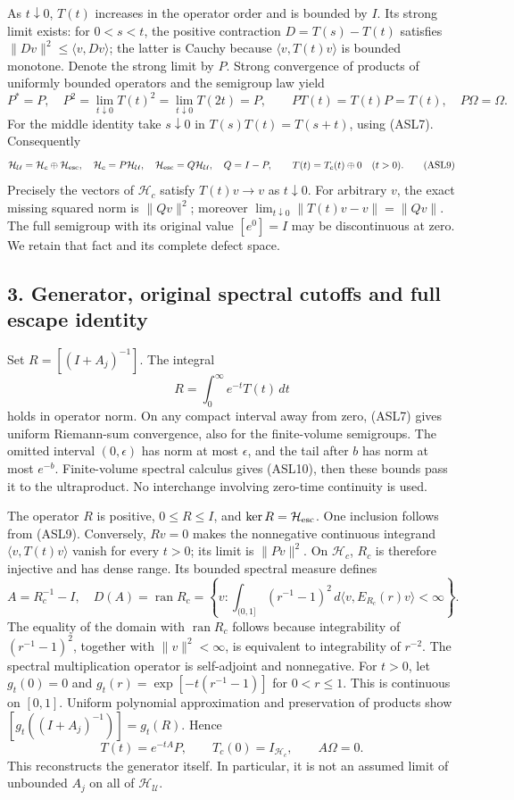 \documentclass[11pt]{article}
\begin{document}
As \(t\downarrow0\), \(T(t)\) increases in the operator order and is bounded by \(I\). Its strong limit exists: for \(0<s<t\), the positive contraction \(D=T(s)-T(t)\) satisfies \(\|Dv\|^2\le\langle v,Dv\rangle\); the latter is Cauchy because \(\langle v,T(t)v\rangle\) is bounded monotone. Denote the strong limit by \(P\). Strong convergence of products of uniformly bounded operators and the semigroup law yield
\[
 P^*=P,\quad P^2=\lim_{t\downarrow0}T(t)^2
 =\lim_{t\downarrow0}T(2t)=P,\qquad
 PT(t)=T(t)P=T(t),\quad P\Omega=\Omega.
 \tag{ASL8}
\]
For the middle identity take \(s\downarrow0\) in \(T(s)T(t)=T(s+t)\), using (ASL7). Consequently
\[
 \mathcal H_{\mathcal U}=\mathcal H_c\oplus\mathcal H_{\rm esc},\quad
 \mathcal H_c=P\mathcal H_{\mathcal U},\quad
 \mathcal H_{\rm esc}=Q\mathcal H_{\mathcal U},\quad Q=I-P,
 \qquad T(t)=T_c(t)\oplus0\quad(t>0).
 \tag{ASL9}
\]
Precisely the vectors of \(\mathcal H_c\) satisfy \(T(t)v\to v\) as \(t\downarrow0\). For arbitrary \(v\), the exact missing squared norm is \(\|Qv\|^2\); moreover \(\lim_{t\downarrow0}\|T(t)v-v\|=\|Qv\|\). The full semigroup with its original value \([e^0]=I\) may be discontinuous at zero. We retain that fact and its complete defect space.

\subsection*{3. Generator, original spectral cutoffs and full escape identity}

Set \(R=[(I+A_j)^{-1}]\). The integral
\[
 R=\int_0^\infty e^{-t}T(t)\,dt
 \tag{ASL10}
\]
holds in operator norm. On any compact interval away from zero, (ASL7) gives uniform Riemann-sum convergence, also for the finite-volume semigroups. The omitted interval \((0,\epsilon)\) has norm at most \(\epsilon\), and the tail after \(b\) has norm at most \(e^{-b}\). Finite-volume spectral calculus gives (ASL10), then these bounds pass it to the ultraproduct. No interchange involving zero-time continuity is used.

The operator \(R\) is positive, \(0\le R\le I\), and \(\ker R=\mathcal H_{\rm esc}\). One inclusion follows from (ASL9). Conversely, \(Rv=0\) makes the nonnegative continuous integrand \(\langle v,T(t)v\rangle\) vanish for every \(t>0\); its limit is \(\|Pv\|^2\). On \(\mathcal H_c\), \(R_c\) is therefore injective and has dense range. Its bounded spectral measure defines
\[
 A=R_c^{-1}-I,\quad
 D(A)=\operatorname{ran}R_c
 =\left\{v:\int_{(0,1]}(r^{-1}-1)^2\,d\langle v,E_{R_c}(r)v\rangle<\infty\right\}.
 \tag{ASL11}
\]
The equality of the domain with \(\operatorname{ran}R_c\) follows because integrability of \((r^{-1}-1)^2\), together with \(\|v\|^2<\infty\), is equivalent to integrability of \(r^{-2}\). The spectral multiplication operator is self-adjoint and nonnegative. For \(t>0\), let \(g_t(0)=0\) and \(g_t(r)=\exp[-t(r^{-1}-1)]\) for \(0<r\le1\). This is continuous on \([0,1]\). Uniform polynomial approximation and preservation of products show \([g_t((I+A_j)^{-1})]=g_t(R)\). Hence
\[
 T(t)=e^{-tA}P,\qquad T_c(0)=I_{\mathcal H_c},\qquad
 A\Omega=0.
 \tag{ASL12}
\]
This reconstructs the generator itself. In particular, it is not an assumed limit of unbounded \(A_j\) on all of \(\mathcal H_{\mathcal U}\).
\end{document}
